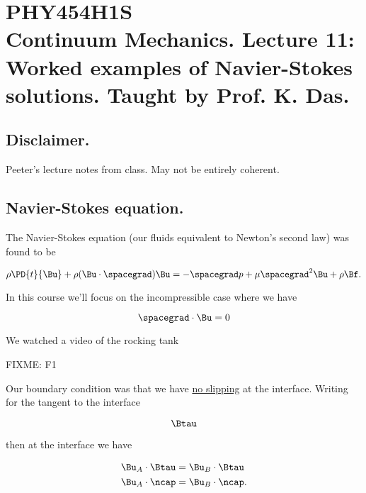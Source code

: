 
%

\chapter{PHY454H1S\\Continuum Mechanics.  Lecture 11: Worked examples of Navier-Stokes solutions.  Taught by Prof. K. Das.}
\label{chap:continuumL11}
{}
\date{Feb 15, 2012}

\beginArtWithToc

\section{Disclaimer.}

Peeter's lecture notes from class.  May not be entirely coherent.

\section{Navier-Stokes equation.}

The Navier-Stokes equation (our fluids equivalent to Newton's second law) was found to be

\begin{equation}\label{eqn:continuumL11:10}
\rho \PD{t}{\Bu} + \rho (\Bu \cdot \spacegrad) \Bu = - \spacegrad p + \mu \spacegrad^2 \Bu + \rho \Bf.
\end{equation}

In this course we'll focus on the incompressible case where we have

\begin{equation}\label{eqn:continuumL11:30}
\spacegrad \cdot \Bu = 0
\end{equation}

We watched a video of the rocking tank

FIXME: F1

Our boundary condition was that we have \underline{no slipping} at the interface.  Writing for the tangent to the interface

\begin{equation}\label{eqn:continuumL11:50}
\Btau
\end{equation}

then at the interface we have

\begin{align}\label{eqn:continuumL11:70}
\Bu_A \cdot \Btau &= \Bu_B \cdot \Btau \\
\Bu_A \cdot \ncap &= \Bu_B \cdot \ncap.
\end{align}


